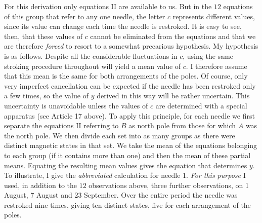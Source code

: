 For this derivation only equations II are available to us. But in the $12$ equations of this group that refer to any one needle, the letter $c$ represents different values, since its value can change each time the needle is restroked. It is easy to see, then, that these values of $c$ cannot be eliminated from the equations and that we are therefore \textit{forced} to resort to a somewhat precarious hypothesis. My hypothesis is as follows. Despite all the considerable fluctuations in $c$, using the same stroking procedure throughout will yield a mean value of $c$. I therefore assume that this mean is the same for both arrangements of the poles. Of course, only very imperfect cancellation can be expected if the needle has been restroked only a few times, so the value of $y$ derived in this way will be rather uncertain. This uncertainty is unavoidable unless the values of $c$ are determined with a special apparatus (see Article 17 above). To apply this principle, for each needle we first separate the equations II referring to $B$ as north pole from those for which $A$ was the north pole. We then divide each set into as many groups as there were distinct magnetic states in that set. We take the mean of the equations belonging to each group (if it contains more than one) and then the mean of these partial means. Equating the resulting mean values gives the equation that determines $y$. To illustrate, I give the \textit{abbreviated} calculation for needle 1. \textit{For this purpose} I used, in addition to the $12$ observations above, three further observations, on 1 August, 7 August and 23 September. Over the entire period the needle was restroked nine times, giving ten distinct states, five for each arrangement of the poles.

